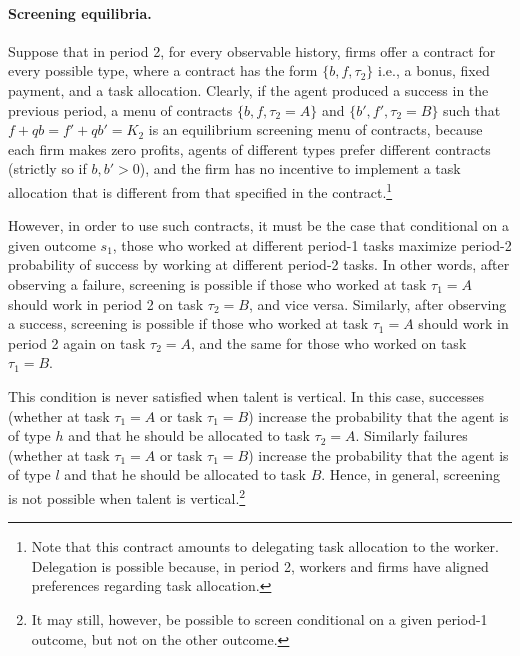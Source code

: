\documentclass[12pt,american]{paper}
\theoremstyle{remark}
\begin{document}


\paragraph*{Screening equilibria.}

Suppose that in period 2, for every observable history,  firms offer a contract for every possible type, where a contract has the form $\{b,f,\tau_2\}$ i.e., a bonus, fixed payment, and a task allocation. Clearly, if the agent produced a success in the previous period, a menu of contracts $\{b,f,\tau_2=A\}$ and $\{b',f',\tau_2=B\}$ such that $f+qb=f'+qb'=K_2$ is an equilibrium screening menu of contracts, because each firm makes zero profits, agents of different types prefer different contracts (strictly so if $b,b'>0$), and the firm has no incentive to implement a task allocation that is different from that specified in the contract.\footnote{Note that this contract amounts to delegating task allocation to the worker. Delegation is possible because, in period 2, workers and firms have aligned preferences regarding task allocation.}

However, in order to use such contracts, it must be the case that conditional on a given outcome $s_1$, those who worked at different period-1 tasks maximize period-2 probability of success by working at different period-2 tasks. In other words, after observing a failure, screening is possible if those who worked at task $\tau_1=A$ should work in period 2 on task $\tau_2=B$, and vice versa. Similarly, after observing a success, screening is possible if those who worked at task $\tau_1=A$ should work in period 2 again on task $\tau_2=A$, and the same for those who worked on task $\tau_1=B$. 

This condition is never satisfied when talent is vertical. In this case, successes (whether at task $\tau_1=A$ or task $\tau_1=B$) increase the probability that the agent is of type $h$ and that he should be allocated to task $\tau_2=A$. Similarly failures (whether at task $\tau_1=A$ or task $\tau_1=B$) increase the probability that the agent is of type $l$ and that he should be allocated to task $B$. Hence, in general, screening is not possible when talent is vertical.\footnote{It may still, however, be possible to screen conditional on a given period-1 outcome, but not on the other outcome. }
\end{document}
